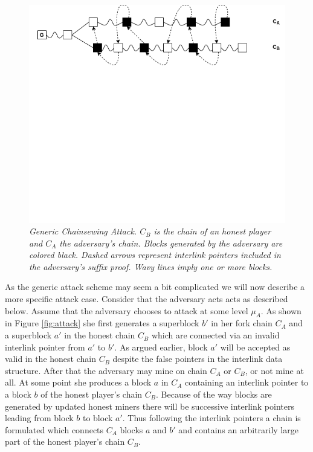 \documentclass[11pt,a4paper]{article}
\begin{document}
\begin{figure}[h]
	\begin{center}
		\includegraphics[scale=0.55]{figures/generic_chainsewing_attack.png}
	\end{center}
	\caption{\textit{Generic Chainsewing Attack. $C_B$ is the chain of an honest player and $C_A$ the adversary's chain. Blocks generated by the adversary are colored black. Dashed arrows represent interlink pointers included in the adversary's suffix proof. Wavy lines imply one or more blocks.}}
	\label{fig:generic_attack}
\end{figure}

As the generic attack scheme may seem a bit complicated we will now describe a more specific attack case. Consider that the adversary acts acts as described below. 
Assume that the adversary chooses to attack at some level $\mu_A$. As shown in Figure \ref{fig:attack} she first generates a superblock $b'$ in her fork chain $C_A$ and a superblock $a'$ in the honest chain $C_B$ which are connected via an invalid interlink pointer from $a'$ to $b'$. As argued earlier, block $a'$ will be accepted as valid in the honest chain $C_B$ despite the false pointers in the interlink data structure. After that the adversary may mine on chain $C_A$ or $C_B$, or not mine at all. At some point she produces a block $a$ in $C_A$ containing an interlink pointer to a block $b$ of the honest player's chain $C_B$. Because of the way blocks are generated by updated honest miners there will be successive interlink pointers leading from block $b$ to block $a'$. Thus following the interlink pointers a chain is formulated which connects $C_A$ blocks $a$ and $b'$ and contains an arbitrarily large part of the honest player's chain $C_B$.
\end{document}
